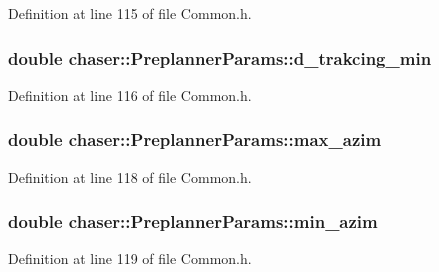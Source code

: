Definition at line 115 of file Common.\+h.

\subsubsection[{\texorpdfstring{d\+\_\+trakcing\+\_\+min}{d_trakcing_min}}]{\setlength{\rightskip}{0pt plus 5cm}double chaser\+::\+Preplanner\+Params\+::d\+\_\+trakcing\+\_\+min}\hypertarget{structchaser_1_1_preplanner_params_aeef51c9ac61b5fa70c853463a27ff879}{}\label{structchaser_1_1_preplanner_params_aeef51c9ac61b5fa70c853463a27ff879}


Definition at line 116 of file Common.\+h.

\subsubsection[{\texorpdfstring{max\+\_\+azim}{max_azim}}]{\setlength{\rightskip}{0pt plus 5cm}double chaser\+::\+Preplanner\+Params\+::max\+\_\+azim}\hypertarget{structchaser_1_1_preplanner_params_ab357e30646928070cd553ccf14be0beb}{}\label{structchaser_1_1_preplanner_params_ab357e30646928070cd553ccf14be0beb}


Definition at line 118 of file Common.\+h.

\subsubsection[{\texorpdfstring{min\+\_\+azim}{min_azim}}]{\setlength{\rightskip}{0pt plus 5cm}double chaser\+::\+Preplanner\+Params\+::min\+\_\+azim}\hypertarget{structchaser_1_1_preplanner_params_aa6846dd2e2d69d5f0d5a9b30710db6e1}{}\label{structchaser_1_1_preplanner_params_aa6846dd2e2d69d5f0d5a9b30710db6e1}


Definition at line 119 of file Common.\+h.

